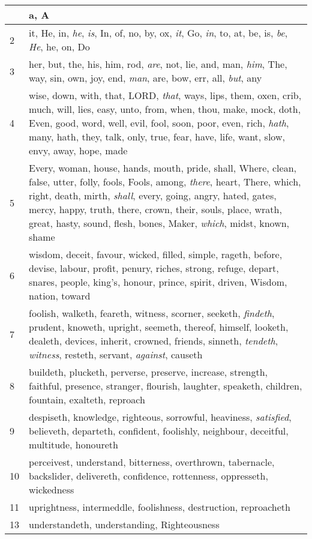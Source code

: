 \begin{center}
\begin{longtable}{l|p{3.75in}}
\hline \hline 
\endlastfoot 
1 & a, A\\ \hline 
2 & it, He, in, \emph{he}, \emph{is}, In, of, no, by, ox, \emph{it}, Go, \emph{in}, to, at, be, is, \emph{be}, \emph{He}, he, on, Do\\ \hline 
3 & her, but, the, his, him, rod, \emph{are}, not, lie, and, man, \emph{him}, The, way, sin, own, joy, end, \emph{man}, are, bow, err, all, \emph{but}, any\\ \hline 
4 & wise, down, with, that, LORD, \emph{that}, ways, lips, them, oxen, crib, much, will, lies, easy, unto, from, when, thou, make, mock, doth, Even, good, word, well, evil, fool, soon, poor, even, rich, \emph{hath}, many, hath, they, talk, only, true, fear, have, life, want, slow, envy, away, hope, made\\ \hline 
5 & Every, woman, house, hands, mouth, pride, shall, Where, clean, false, utter, folly, fools, Fools, among, \emph{there}, heart, There, which, right, death, mirth, \emph{shall}, every, going, angry, hated, gates, mercy, happy, truth, there, crown, their, souls, place, wrath, great, hasty, sound, flesh, bones, Maker, \emph{which}, midst, known, shame\\ \hline 
6 & wisdom, deceit, favour, wicked, filled, simple, rageth, before, devise, labour, profit, penury, riches, strong, refuge, depart, snares, people, king's, honour, prince, spirit, driven, Wisdom, nation, toward\\ \hline 
7 & foolish, walketh, feareth, witness, scorner, seeketh, \emph{findeth}, prudent, knoweth, upright, seemeth, thereof, himself, looketh, dealeth, devices, inherit, crowned, friends, sinneth, \emph{tendeth}, \emph{witness}, resteth, servant, \emph{against}, causeth\\ \hline 
8 & buildeth, plucketh, perverse, preserve, increase, strength, faithful, presence, stranger, flourish, laughter, speaketh, children, fountain, exalteth, reproach\\ \hline 
9 & despiseth, knowledge, righteous, sorrowful, heaviness, \emph{satisfied}, believeth, departeth, confident, foolishly, neighbour, deceitful, multitude, honoureth\\ \hline 
10 & perceivest, understand, bitterness, overthrown, tabernacle, backslider, delivereth, confidence, rottenness, oppresseth, wickedness\\ \hline 
11 & uprightness, intermeddle, foolishness, destruction, reproacheth\\ \hline 
13 & understandeth, understanding, Righteousness\\ \hline 
\end{longtable} 
\end{center} 




 
